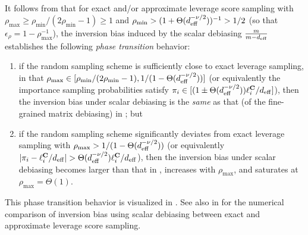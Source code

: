 \documentclass[11pt,a4paper]{article}
\begin{document}
\begin{remark}\normalfont
\label{rem:inv_bias_exact_VS_approx}
It follows from  that for exact and/or approximate leverage score sampling with $\rho_{\max} \geq \rho_{\min}/(2\rho_{\min}-1)\geq 1$ and $\rho_{\min}>(1+\Theta(d_{\mathrm{eff}}^{-\nu/2}))^{-1}> 1/2$ (so that $\epsilon_{\rho}= 1 - \rho_{\max}^{-1}$), the inversion bias induced by the scalar debiasing $ \frac{m}{m-d_{\mathrm{eff}}}$ establishes the following \emph{phase transition} behavior:
\begin{enumerate}%
    \item if the random sampling scheme is sufficiently close to exact leverage sampling, in that $\rho_{\max} \in [\rho_{\min}/(2\rho_{\min}-1), 1/(1 - \Theta(d_{\mathrm{eff}}^{-\nu/2}) )]$ (or equivalently the importance sampling probabilities satisfy $\pi_i \in [(1 \pm  \Theta(d_{\mathrm{eff}}^{-\nu/2})) \ell_i^{\mathbf{C}}/d_{\mathrm{eff}}]$), then the inversion bias under scalar debiasing is the \emph{same} as that (of the fine-grained matrix debiasing) in ; but
    \item if the random sampling scheme significantly deviates from exact leverage sampling with $\rho_{\max} > 1/(1 - \Theta(d_{\mathrm{eff}}^{-\nu/2}) )$ (or equivalently $|\pi_i- \ell_i^{\C}/d_{\eff}|>\Theta(d_{\eff}^{-\nu/2})\ell_i^{\C}/d_{\eff}$), then the inversion bias under scalar debiasing becomes larger than that in , increases with $\rho_{\max}$, and saturates at $\rho_{\max} = \Theta(1)$.%
\end{enumerate}
This phase transition behavior is visualized in . 
See also  in  for the numerical comparison of inversion bias using scalar debiasing between exact and approximate leverage score sampling.
\end{remark}
\end{document}
